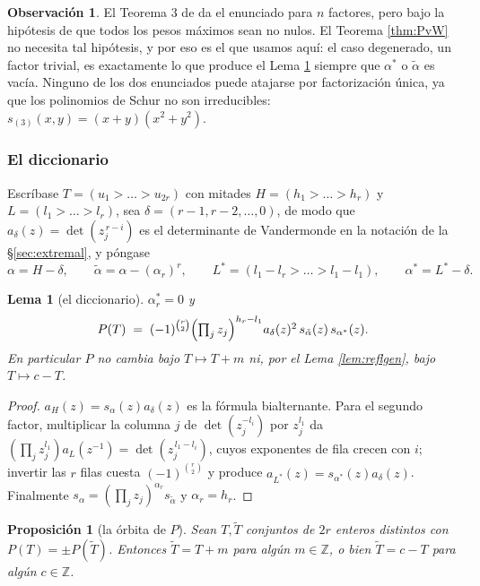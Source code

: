 \documentclass[11pt,reqno]{amsart}
\theoremstyle{plain}
\newtheorem{lemma}[theorem]{Lema}
\newtheorem{proposition}[theorem]{Proposición}
\theoremstyle{definition}
\newtheorem{remark}[theorem]{Observación}
\newcommand{\ZZ}{\mathbb{Z}}
\begin{document}
\begin{remark}
El Teorema 3 de \cite{Rajan} da el enunciado para $n$ factores, pero bajo la hipótesis de que todos
los pesos máximos sean no nulos. El Teorema \ref{thm:PvW} no necesita tal hipótesis, y por eso es el
que usamos aquí: el caso degenerado, un factor trivial, es exactamente lo que produce el Lema
\ref{lem:dictgen} siempre que $\alpha^{*}$ o $\tilde\alpha$ es vacía. Ninguno de los dos enunciados
puede atajarse por factorización única, ya que los polinomios de Schur no son irreducibles:
$s_{(3)}(x,y)=(x+y)(x^2+y^2)$.
\end{remark}

\subsubsection*{El diccionario}

Escríbase $T=(u_1>\dots>u_{2r})$ con mitades $H=(h_1>\dots>h_r)$ y $L=(l_1>\dots>l_r)$, sea
$\delta=(r-1,r-2,\dots,0)$, de modo que $a_\delta(z)=\det(z_j^{\,r-i})$ es el determinante de
Vandermonde en la notación de la \S\ref{sec:extremal}, y póngase
\[
  \alpha=H-\delta,\qquad \tilde\alpha=\alpha-(\alpha_r)^{r},\qquad
  L^{*}=(l_1-l_r>\dots>l_1-l_1),\qquad \alpha^{*}=L^{*}-\delta .
\]

\begin{lemma}[el diccionario]\label{lem:dictgen}
$\alpha^{*}_r=0$ y
\begin{equation}\label{eq:dictgen}
  P(T)\;=\;(-1)^{\binom r2}\Bigl(\textstyle\prod_j z_j\Bigr)^{h_r-l_1}
  a_\delta(z)^2\,s_{\tilde\alpha}(z)\,s_{\alpha^{*}}(z).
\end{equation}
En particular $P$ no cambia bajo $T\mapsto T+m$ ni, por el Lema \ref{lem:reflgen}, bajo
$T\mapsto c-T$.
\end{lemma}

\begin{proof}
$a_H(z)=s_\alpha(z)a_\delta(z)$ es la fórmula bialternante. Para el segundo factor, multiplicar la
columna $j$ de $\det(z_j^{-l_i})$ por $z_j^{l_1}$ da
$(\prod_j z_j^{l_1})a_L(z^{-1})=\det(z_j^{\,l_1-l_i})$, cuyos exponentes de fila crecen con $i$;
invertir las $r$ filas cuesta $(-1)^{\binom r2}$ y produce $a_{L^{*}}(z)=s_{\alpha^{*}}(z)a_\delta(z)$.
Finalmente $s_\alpha=(\prod_j z_j)^{\alpha_r}s_{\tilde\alpha}$ y $\alpha_r=h_r$.
\end{proof}

\begin{proposition}[la órbita de $P$]\label{prop:orbitgen}
Sean $T,\widetilde T$ conjuntos de $2r$ enteros distintos con $P(T)=\pm P(\widetilde T)$. Entonces
$\widetilde T=T+m$ para algún $m\in\ZZ$, o bien $\widetilde T=c-T$ para algún $c\in\ZZ$.
\end{proposition}
\end{document}
